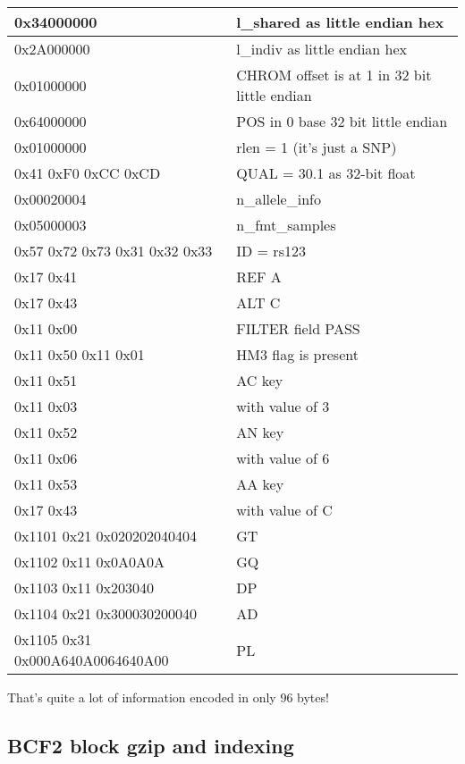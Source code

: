 \documentclass[8pt]{article}
\begin{document}
\vspace{0.3cm}
\begin{tabular}{|l| l|} \hline
0x34000000 & l\_shared as little endian hex \\ \hline
0x2A000000 & l\_indiv as little endian hex \\ \hline
0x01000000 & CHROM offset is at 1 in 32 bit little endian \\ \hline
0x64000000 & POS in 0 base 32 bit little endian \\ \hline
0x01000000 & rlen = 1 (it's just a SNP) \\ \hline
0x41 0xF0 0xCC 0xCD & QUAL = 30.1 as 32-bit float \\ \hline
0x00020004 & n\_allele\_info \\ \hline
0x05000003 & n\_fmt\_samples \\ \hline
0x57 0x72 0x73 0x31 0x32 0x33 & ID = rs123 \\ \hline
0x17 0x41 & REF A \\ \hline
0x17 0x43 & ALT C \\ \hline
0x11 0x00 & FILTER field PASS \\ \hline
0x11 0x50 0x11 0x01 & HM3 flag is present \\ \hline
0x11 0x51 & AC key \\ \hline
0x11 0x03 & with value of 3 \\ \hline
0x11 0x52 & AN key \\ \hline
0x11 0x06 & with value of 6 \\ \hline
0x11 0x53 & AA key \\ \hline
0x17 0x43 & with value of C \\ \hline
0x1101 0x21 0x020202040404 & GT \\ \hline
0x1102 0x11 0x0A0A0A & GQ \\ \hline
0x1103 0x11 0x203040 & DP \\ \hline
0x1104 0x21 0x300030200040 & AD \\ \hline
0x1105 0x31 0x000A640A0064640A00 & PL \\ \hline
\end{tabular}
\vspace{0.3cm}

That's quite a lot of information encoded in only 96 bytes!

\subsection{BCF2 block gzip and indexing}
\end{document}
